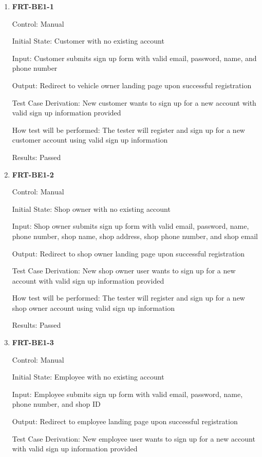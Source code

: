 \documentclass[12pt, titlepage]{article}
\begin{document}
\begin{enumerate}

	\item \textbf{FRT-BE1-1}

	      Control: Manual

	      Initial State: Customer with no existing account

	      Input: Customer submits sign up form with valid email, password, name, and phone number

	      Output: Redirect to vehicle owner landing page upon successful registration

	      Test Case Derivation: New customer wants to sign up for a new account with valid sign up
	      information provided

	      How test will be performed: The tester will register and sign up for a new customer account using
	      valid sign up information

	      Results: Passed

	\item \textbf{FRT-BE1-2}

	      Control: Manual

	      Initial State: Shop owner with no existing account

	      Input: Shop owner submits sign up form with valid email, password, name, phone number, shop name,
	      shop address, shop phone number, and shop email

	      Output: Redirect to shop owner landing page upon successful registration

	      Test Case Derivation: New shop owner user wants to sign up for a new account with valid sign up
	      information provided

	      How test will be performed: The tester will register and sign up for a new shop owner account using
	      valid sign up information

	      Results: Passed

	\item \textbf{FRT-BE1-3}

	      Control: Manual

	      Initial State: Employee with no existing account

	      Input: Employee submits sign up form with valid email, password, name, phone number, and shop ID

	      Output: Redirect to employee landing page upon successful registration

	      Test Case Derivation: New employee user wants to sign up for a new account with valid sign up
	      information provided


\end{enumerate}
\end{document}
